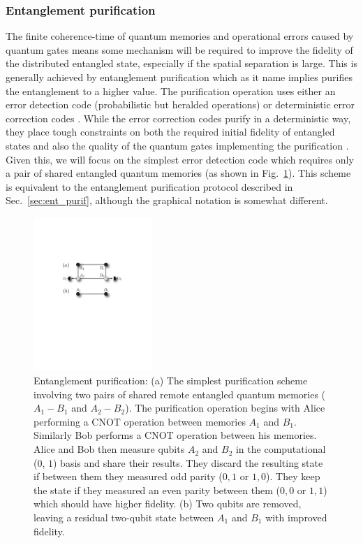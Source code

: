 \documentclass[twocolumn, aps, rmp, amsmath, amssymb, nofootinbib, superscriptaddress, longbibliography, floatfix, table-of-contents, eqsecnum]{revtex4-1}
\begin{document}
\subsubsection{Entanglement purification}\label{sec:reps_ent_purif}

The finite coherence-time of quantum memories and operational errors caused by quantum gates means some mechanism will be required to improve the fidelity of the distributed entangled state, especially if the spatial separation is large. This is generally achieved by entanglement purification \cite{Bennett96, Deutsch98, dur98, pan01, dur07, Aschauer2004, jiang09, munro12, Stephens2013} which  as it name implies purifies the entanglement to a higher value. The purification operation uses either an error detection code (probabilistic but heralded operations) \cite{Bennett96, Deutsch98, dur98} or deterministic error correction codes \cite{Aschauer2004, jiang09, munro12}. While the error correction codes purify in a deterministic way, they place tough constraints on both the required initial fidelity of entangled states and also the quality of the quantum gates implementing the purification \cite{Aschauer2004}. Given this, we will focus on the simplest error detection code which requires only a pair of shared entangled quantum memories (as shown in Fig.~\ref{fig:repeaters_4}). This scheme is equivalent to the entanglement purification protocol described in Sec.~\ref{sec:ent_purif}, although the graphical notation is somewhat different.

\begin{figure}[!htb]
\includegraphics[width=0.4\textwidth]{repeaters_4}
\caption{Entanglement purification: (a) The simplest purification scheme involving two pairs of shared remote entangled quantum memories (\mbox{$A_1-B_1$} and \mbox{$A_2-B_2$}). The purification operation begins with Alice performing a CNOT operation between memories $A_1$ and $B_1$. Similarly Bob performs a CNOT operation between his memories. Alice and Bob then measure qubits $A_2$ and $B_2$ in the computational ($0$, $1$) basis and share their results. They discard the resulting state if between them they measured odd parity ($0,1$ or $1,0$). They keep the state if they measured an even parity between them ($0,0$ or $1,1$) which should have higher fidelity. (b) Two qubits are removed, leaving a residual two-qubit state between $A_1$ and $B_1$ with improved fidelity.} 
\label{fig:repeaters_4}
\end{figure} 
\end{document}
